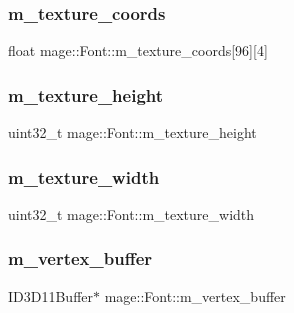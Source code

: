 \hypertarget{classmage_1_1_font_a6b03de184fbf6fa4e663d711e86656f0}{}\label{classmage_1_1_font_a6b03de184fbf6fa4e663d711e86656f0} 
\subsubsection{\texorpdfstring{m\+\_\+texture\+\_\+coords}{m\_texture\_coords}}
{\footnotesize\ttfamily float mage\+::\+Font\+::m\+\_\+texture\+\_\+coords\mbox{[}96\mbox{]}\mbox{[}4\mbox{]}\hspace{0.3cm}{\ttfamily [protected]}}

\hypertarget{classmage_1_1_font_afcc7dba6d0991eca65a32d55b6cba503}{}\label{classmage_1_1_font_afcc7dba6d0991eca65a32d55b6cba503} 
\subsubsection{\texorpdfstring{m\+\_\+texture\+\_\+height}{m\_texture\_height}}
{\footnotesize\ttfamily uint32\+\_\+t mage\+::\+Font\+::m\+\_\+texture\+\_\+height\hspace{0.3cm}{\ttfamily [protected]}}

\hypertarget{classmage_1_1_font_ab74c50dc44037c95c7a568c9695d520b}{}\label{classmage_1_1_font_ab74c50dc44037c95c7a568c9695d520b} 
\subsubsection{\texorpdfstring{m\+\_\+texture\+\_\+width}{m\_texture\_width}}
{\footnotesize\ttfamily uint32\+\_\+t mage\+::\+Font\+::m\+\_\+texture\+\_\+width\hspace{0.3cm}{\ttfamily [protected]}}

\hypertarget{classmage_1_1_font_aa22cbecaebb02a21eb07d0fe0ca0eed4}{}\label{classmage_1_1_font_aa22cbecaebb02a21eb07d0fe0ca0eed4} 
\subsubsection{\texorpdfstring{m\+\_\+vertex\+\_\+buffer}{m\_vertex\_buffer}}
{\footnotesize\ttfamily I\+D3\+D11\+Buffer$\ast$ mage\+::\+Font\+::m\+\_\+vertex\+\_\+buffer\hspace{0.3cm}{\ttfamily [protected]}}

